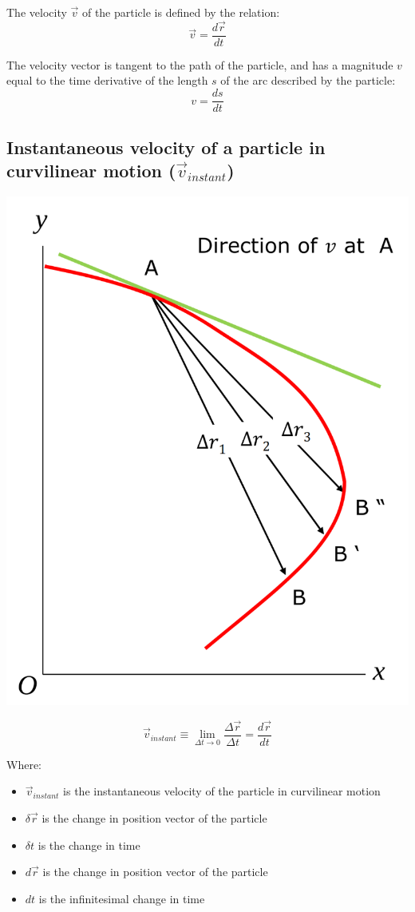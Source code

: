\documentclass[11pt]{article}
\begin{document}
The velocity \(\vec{v}\) of the particle is defined by the relation:
\[\vec{v} = \frac{d \vec{r}}{dt}\]

The velocity vector is tangent to the path of the particle, and has a magnitude \(v\) equal to the time derivative of the length \(s\) of the arc described by the particle:
\[v = \frac{ds}{dt}\]
\subsection{Instantaneous velocity of a particle in curvilinear motion (\(\vec{v}_{instant}\))}
\label{sec:orgf9c91b9}
\begin{center}
\includegraphics[scale=0.6]{./images/instantaneous-velocity-in-curvilinear-motion.png}
\end{center}

\[\vec{v}_{instant} \equiv \lim_{\Delta t \rightarrow 0} \frac{\Delta \vec{r}}{\Delta t} = \frac{d \vec{r}}{dt}\]

Where:
\begin{itemize}
\item \(\vec{v}_{instant}\) is the instantaneous velocity of the particle in curvilinear motion
\item \(\delta \vec{r}\) is the change in position vector of the particle
\item \(\delta t\) is the change in time
\item \(d \vec{r}\) is the change in position vector of the particle
\item \(dt\) is the infinitesimal change in time
\end{itemize}
\end{document}
